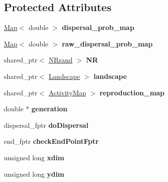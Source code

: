 \subsection*{Protected Attributes}
\begin{DoxyCompactItemize}
\item 
\hyperlink{class_map}{Map}$<$ double $>$ {\bfseries dispersal\+\_\+prob\+\_\+map}\hypertarget{class_dispersal_coordinator_ac840e1b9b3da20c131137c2801754d87}{}\label{class_dispersal_coordinator_ac840e1b9b3da20c131137c2801754d87}

\item 
\hyperlink{class_map}{Map}$<$ double $>$ {\bfseries raw\+\_\+dispersal\+\_\+prob\+\_\+map}\hypertarget{class_dispersal_coordinator_a7813e9d02d42c9326199cad342744592}{}\label{class_dispersal_coordinator_a7813e9d02d42c9326199cad342744592}

\item 
shared\+\_\+ptr$<$ \hyperlink{class_n_rrand}{N\+Rrand} $>$ {\bfseries NR}\hypertarget{class_dispersal_coordinator_ae5c7864710a88da0bdb27bd7e21fd894}{}\label{class_dispersal_coordinator_ae5c7864710a88da0bdb27bd7e21fd894}

\item 
shared\+\_\+ptr$<$ \hyperlink{class_landscape}{Landscape} $>$ {\bfseries landscape}\hypertarget{class_dispersal_coordinator_a2f13a2fa99be8283efb2c29637ed5e9f}{}\label{class_dispersal_coordinator_a2f13a2fa99be8283efb2c29637ed5e9f}

\item 
shared\+\_\+ptr$<$ \hyperlink{class_activity_map}{Activity\+Map} $>$ {\bfseries reproduction\+\_\+map}\hypertarget{class_dispersal_coordinator_abcb6ca3c2ff84a07fe9324231317c5ca}{}\label{class_dispersal_coordinator_abcb6ca3c2ff84a07fe9324231317c5ca}

\item 
double $\ast$ {\bfseries generation}\hypertarget{class_dispersal_coordinator_ae3f83d100dad7c60137edf42b3c199c1}{}\label{class_dispersal_coordinator_ae3f83d100dad7c60137edf42b3c199c1}

\item 
dispersal\+\_\+fptr {\bfseries do\+Dispersal}\hypertarget{class_dispersal_coordinator_a93262d2bb612108bfcdc56c1ba11bad1}{}\label{class_dispersal_coordinator_a93262d2bb612108bfcdc56c1ba11bad1}

\item 
end\+\_\+fptr {\bfseries check\+End\+Point\+Fptr}\hypertarget{class_dispersal_coordinator_a1612005c176cd769797a4d4e459e2dec}{}\label{class_dispersal_coordinator_a1612005c176cd769797a4d4e459e2dec}

\item 
unsigned long {\bfseries xdim}\hypertarget{class_dispersal_coordinator_a66668e6ceec55afa61c1e99719bc6146}{}\label{class_dispersal_coordinator_a66668e6ceec55afa61c1e99719bc6146}

\item 
unsigned long {\bfseries ydim}\hypertarget{class_dispersal_coordinator_af4ac8eb94f393cf650a9709a55a112c7}{}\label{class_dispersal_coordinator_af4ac8eb94f393cf650a9709a55a112c7}

\end{DoxyCompactItemize}



